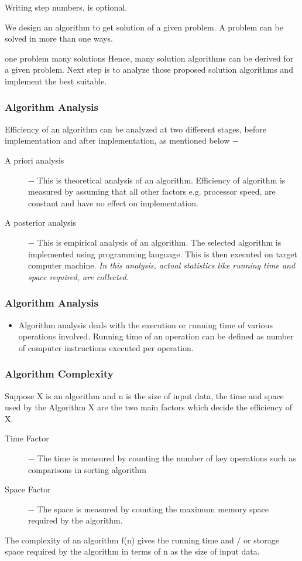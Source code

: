 \documentclass{beamer}
\begin{document}
\begin{frame}
Writing step numbers, is optional.

We design an algorithm to get solution of a given problem. A problem can be solved in more than one ways.

one problem many solutions
Hence, many solution algorithms can be derived for a given problem. Next step is to analyze those proposed solution algorithms and implement the best suitable.
\end{frame}
\begin{frame}
\frametitle{Algorithm Analysis}
Efficiency of an algorithm can be analyzed at two different stages, before implementation and after implementation, as mentioned below −
\begin{description}
\item[A priori analysis] − This is theoretical analysis of an algorithm. Efficiency of algorithm is measured by assuming that all other factors e.g. processor speed, are constant and have no effect on implementation.

\item[A posterior analysis] − This is empirical analysis of an algorithm. The selected algorithm is implemented using programming language. This is then executed on target computer machine. \textit{In this analysis, actual statistics like running time and space required, are collected.}
\end{description}
\end{frame}
\begin{frame}
	\frametitle{Algorithm Analysis}
\begin{itemize}
	\item Algorithm analysis deals with the execution or running time of various operations involved. Running time of an operation can be defined as number of computer instructions executed per operation.
\end{itemize} 
\end{frame}
\begin{frame}
\frametitle{Algorithm Complexity}
Suppose X is an algorithm and n is the size of input data, the time and space used by the Algorithm X are the two main factors which decide the efficiency of X.
\begin{description}
\item[Time Factor] − The time is measured by counting the number of key operations such as comparisons in sorting algorithm

\item[Space Factor] − The space is measured by counting the maximum memory space required by the algorithm.
\end{description}
The complexity of an algorithm f(n) gives the running time and / or storage space required by the algorithm in terms of n as the size of input data.
\end{frame}
\end{document}
